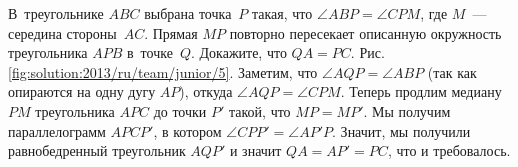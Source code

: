 \problem{}
В~треугольнике $ABC$ выбрана точка~$P$ такая, что $\angle ABP = \angle CPM$,
где $M$~--- середина стороны~$AC$.
Прямая $MP$ повторно пересекает описанную окружность треугольника $APB$
в~точке~$Q$.
Докажите, что $QA = PC$.
%
\label{solution:2013/ru/team/junior/5}
Рис. \ref{fig:solution:2013/ru/team/junior/5}.
Заметим, что $\angle AQP = \angle ABP$ (так как опираются на одну дугу $AP$),
откуда $\angle AQP = \angle CPM$.
Теперь продлим медиану $PM$ треугольника $APC$ до точки $P'$ такой, что
$MP = MP'$.
Мы получим параллелограмм $APCP'$, в котором $\angle CPP' = \angle AP'P$.
Значит, мы получили равнобедренный треугольник $AQP'$ и значит $QA = AP' = PC$,
что и требовалось. 
\endproblem
